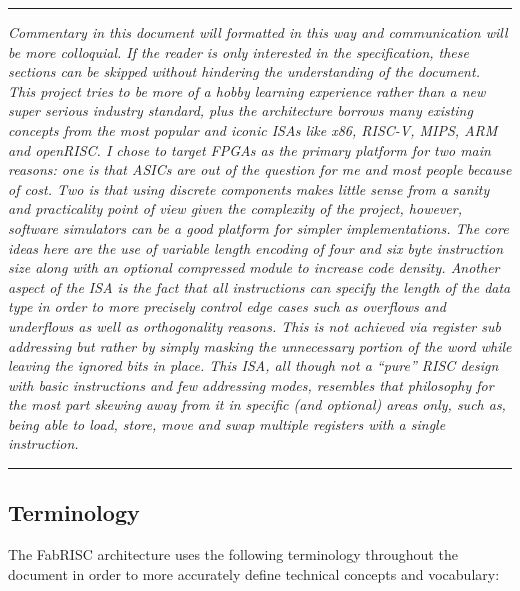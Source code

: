     \par\noindent\rule{\textwidth}{0.4pt}
    \textit{Commentary in this document will formatted in this way and communication will be more colloquial. If the reader is only interested in the specification, these sections can be skipped without hindering the understanding of the document. This project tries to be more of a hobby learning experience rather than a new super serious industry standard, plus the architecture borrows many existing concepts from the most popular and iconic ISAs like x86, RISC-V, MIPS, ARM and openRISC. I chose to target FPGAs as the primary platform for two main reasons: one is that ASICs are out of the question for me and most people because of cost. Two is that using discrete components makes little sense from a sanity and practicality point of view given the complexity of the project, however, software simulators can be a good platform for simpler implementations. The core ideas here are the use of variable length encoding of four and six byte instruction size along with an optional compressed module to increase code density. Another aspect of the ISA is the fact that all instructions can specify the length of the data type in order to more precisely control edge cases such as overflows and underflows as well as orthogonality reasons. This is not achieved via register sub addressing but rather by simply masking the unnecessary portion of the word while leaving the ignored bits in place. This ISA, all though not a ``pure'' RISC design with basic instructions and few addressing modes, resembles that philosophy for the most part skewing away from it in specific (and optional) areas only, such as, being able to load, store, move and swap multiple registers with a single instruction.}
    \par\noindent\rule{\textwidth}{0.4pt}

    \subsection[Terminology]{Terminology}

        \vspace{10pt}

        The FabRISC architecture uses the following terminology throughout the document in order to more accurately define technical concepts and vocabulary:

